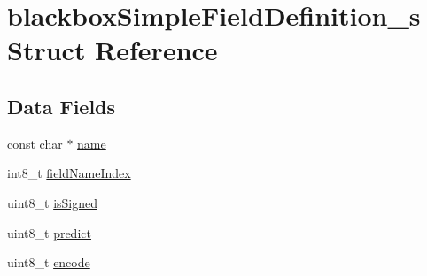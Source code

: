\hypertarget{structblackboxSimpleFieldDefinition__s}{\section{blackbox\+Simple\+Field\+Definition\+\_\+s Struct Reference}
\label{structblackboxSimpleFieldDefinition__s}
}
\subsection*{Data Fields}
\begin{DoxyCompactItemize}
\item 
const char $\ast$ \hyperlink{structblackboxSimpleFieldDefinition__s_aab7f51a094f80c39193a408677f189af}{name}
\item 
int8\+\_\+t \hyperlink{structblackboxSimpleFieldDefinition__s_aec4b11bf12de4ae33780fef3e14b5ef3}{field\+Name\+Index}
\item 
uint8\+\_\+t \hyperlink{structblackboxSimpleFieldDefinition__s_add1a08bb5c30602f9d44723bf7243fa9}{is\+Signed}
\item 
uint8\+\_\+t \hyperlink{structblackboxSimpleFieldDefinition__s_a1fa810242c7c545c0abc8082b75cad9b}{predict}
\item 
uint8\+\_\+t \hyperlink{structblackboxSimpleFieldDefinition__s_a24b433da3ab127cbffd27d31f39b8a0e}{encode}
\end{DoxyCompactItemize}


